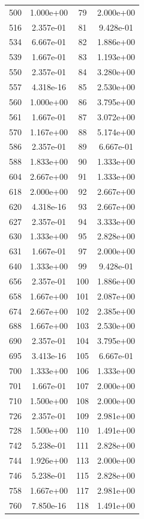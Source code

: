 \documentclass[12pt]{article}
\begin{document}
\begin{longtable}{@{}cccc@{}}
500 & 1.000e+00 & 79 & 2.000e+00 \\
516 & 2.357e-01 & 81 & 9.428e-01 \\
534 & 6.667e-01 & 82 & 1.886e+00 \\
539 & 1.667e-01 & 83 & 1.193e+00 \\
550 & 2.357e-01 & 84 & 3.280e+00 \\
557 & 4.318e-16 & 85 & 2.530e+00 \\
560 & 1.000e+00 & 86 & 3.795e+00 \\
561 & 1.667e-01 & 87 & 3.072e+00 \\
570 & 1.167e+00 & 88 & 5.174e+00 \\
586 & 2.357e-01 & 89 & 6.667e-01 \\
588 & 1.833e+00 & 90 & 1.333e+00 \\
604 & 2.667e+00 & 91 & 1.333e+00 \\
618 & 2.000e+00 & 92 & 2.667e+00 \\
620 & 4.318e-16 & 93 & 2.667e+00 \\
627 & 2.357e-01 & 94 & 3.333e+00 \\
630 & 1.333e+00 & 95 & 2.828e+00 \\
631 & 1.667e-01 & 97 & 2.000e+00 \\
640 & 1.333e+00 & 99 & 9.428e-01 \\
656 & 2.357e-01 & 100 & 1.886e+00 \\
658 & 1.667e+00 & 101 & 2.087e+00 \\
674 & 2.667e+00 & 102 & 2.385e+00 \\
688 & 1.667e+00 & 103 & 2.530e+00 \\
690 & 2.357e-01 & 104 & 3.795e+00 \\
695 & 3.413e-16 & 105 & 6.667e-01 \\
700 & 1.333e+00 & 106 & 1.333e+00 \\
701 & 1.667e-01 & 107 & 2.000e+00 \\
710 & 1.500e+00 & 108 & 2.000e+00 \\
726 & 2.357e-01 & 109 & 2.981e+00 \\
728 & 1.500e+00 & 110 & 1.491e+00 \\
742 & 5.238e-01 & 111 & 2.828e+00 \\
744 & 1.926e+00 & 113 & 2.000e+00 \\
746 & 5.238e-01 & 115 & 2.828e+00 \\
758 & 1.667e+00 & 117 & 2.981e+00 \\
760 & 7.850e-16 & 118 & 1.491e+00 \\

\end{longtable}
\end{document}
